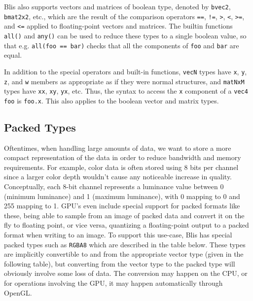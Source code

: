 \documentclass[11pt]{article}
\newcommand{\code}[1]{\texttt{#1}}
\begin{document}
Blis also supports vectors and matrices of boolean type, denoted by \code{bvec2}, \code{bmat2x2}, etc., which are the result of the comparison operators \code{==}, \code{!=}, \code{>}, \code{<}, \code{>=}, and \code{<=} applied to floating-point vectors and matrices. The builtin functions \code{all()} and \code{any()} can be used to reduce these types to a single boolean value, so that e.g. \code{all(foo == bar)} checks that all the components of \code{foo} and \code{bar} are equal.

In addition to the special operators and built-in functions, \code{vecN} types have \code{x}, \code{y}, \code{z}, and \code{w} members as appropriate as if they were normal structures, and \code{matNxM} types have \code{xx}, \code{xy}, \code{yx}, etc. Thus, the syntax to access the \code{x} component of a \code{vec4 foo} is \code{foo.x}. This also applies to the boolean vector and matrix types.

\subsection{Packed Types}

Oftentimes, when handling large amounts of data, we want to store a more compact representation of the data in order to reduce bandwidth and memory requirements. For example, color data is often stored using 8 bits per channel since a larger color depth wouldn't cause any noticeable increase in quality. Conceptually, each 8-bit channel represents a luminance value between 0 (minimum luminance) and 1 (maximum luminance), with 0 mapping to 0 and 255 mapping to 1. GPU's even include special support for packed formats like these, being able to sample from an image of packed data and convert it on the fly to floating point, or vice versa, quantizing a floating-point output to a packed format when writing to an image. To support this use-case, Blis has special packed types such as \code{RGBA8} which are described in the table below. These types are implicitly convertible to and from the appropriate vector type (given in the following table), but converting from the vector type to the packed type will obviously involve some loss of data. The conversion may happen on the CPU, or for operations involving the GPU, it may happen automatically through OpenGL.

\vspace{3mm}
\end{document}
